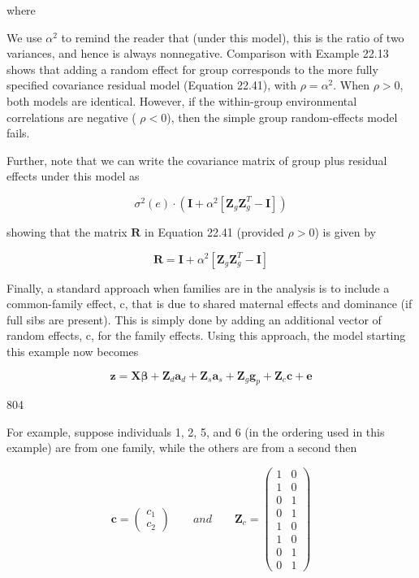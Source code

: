 \documentclass{article}
\begin{document}
where

We use  $ \alpha^2 $ to remind the reader that (under this model), this is the ratio of two variances, and hence is always nonnegative. Comparison with Example 22.13 shows that adding a random effect for group corresponds to the more fully specified covariance residual model (Equation 22.41), with  $ \rho = \alpha^2 $. When  $ \rho > 0 $, both models are identical. However, if the within-group environmental correlations are negative ( $ \rho < 0 $), then the simple group random-effects model fails.

Further, note that we can write the covariance matrix of group plus residual effects under this model as

\begin{equation}
\sigma^{2}(e)\cdot\left(\mathbf{I}+\alpha^{2}\left[\mathbf{Z}_{g}\mathbf{Z}_{g}^{T}-\mathbf{I}\right]\right)
\end{equation}

showing that the matrix  $ \mathbf{R} $ in Equation 22.41 (provided  $ \rho > 0 $) is given by

\begin{equation}
\mathbf{R}=\mathbf{I}+\alpha^{2}\left[\mathbf{Z}_{g}\mathbf{Z}_{g}^{T}-\mathbf{I}\right]
\end{equation}

Finally, a standard approach when families are in the analysis is to include a common-family effect, c, that is due to shared maternal effects and dominance (if full sibs are present). This is simply done by adding an additional vector of random effects, c, for the family effects. Using this approach, the model starting this example now becomes

\begin{equation}
\mathbf{z}=\mathbf{X}\boldsymbol{\beta}+\mathbf{Z}_{d}\mathbf{a}_{d}+\mathbf{Z}_{s}\mathbf{a}_{s}+\mathbf{Z}_{g}\mathbf{g}_{p}+\mathbf{Z}_{c}\mathbf{c}+\mathbf{e}
\end{equation}

804

For example, suppose individuals 1, 2, 5, and 6 (in the ordering used in this example) are from one family, while the others are from a second then

\begin{equation}
\mathbf{c}=\begin{pmatrix}{{{c_{1}}}} \\{{{c_{2}}}}\end{pmatrix}\qquad and\qquad\mathbf{Z}_{c}=\begin{pmatrix}{{{1}}}&{{{0}}} \\{{{1}}}&{{{0}}} \\{{{0}}}&{{{1}}} \\{{{0}}}&{{{1}}} \\{{{1}}}&{{{0}}} \\{{{1}}}&{{{0}}} \\{{{0}}}&{{{1}}} \\{{{0}}}&{{{1}}}\end{pmatrix}
\end{equation}
\end{document}
